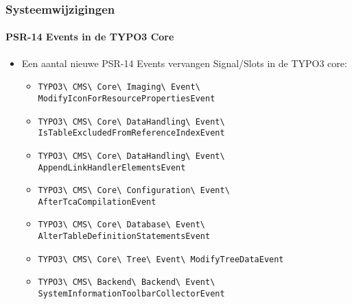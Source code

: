 \begin{frame}[fragile]
	\frametitle{Systeemwijzigingen}
	\framesubtitle{PSR-14 Events in de TYPO3 Core}

	\begin{itemize}
		\item Een aantal nieuwe PSR-14 Events vervangen Signal/Slots in de TYPO3 core:
			\newline

			\begin{itemize}\tiny
				\item \texttt{TYPO3\textbackslash
					CMS\textbackslash
					Core\textbackslash
					Imaging\textbackslash
					Event\textbackslash
					ModifyIconForResourcePropertiesEvent}
					\newline
				\item \texttt{TYPO3\textbackslash
					CMS\textbackslash
					Core\textbackslash
					DataHandling\textbackslash
					Event\textbackslash
					IsTableExcludedFromReferenceIndexEvent}
					\newline
				\item \texttt{TYPO3\textbackslash
					CMS\textbackslash
					Core\textbackslash
					DataHandling\textbackslash
					Event\textbackslash
					AppendLinkHandlerElementsEvent}
					\newline
				\item \texttt{TYPO3\textbackslash
					CMS\textbackslash
					Core\textbackslash
					Configuration\textbackslash
					Event\textbackslash
					AfterTcaCompilationEvent}
					\newline
				\item \texttt{TYPO3\textbackslash
					CMS\textbackslash
					Core\textbackslash
					Database\textbackslash
					Event\textbackslash
					AlterTableDefinitionStatementsEvent}
					\newline
				\item \texttt{TYPO3\textbackslash
					CMS\textbackslash
					Core\textbackslash
					Tree\textbackslash
					Event\textbackslash
					ModifyTreeDataEvent}
					\newline
				\item \texttt{TYPO3\textbackslash
					CMS\textbackslash
					Backend\textbackslash
					Backend\textbackslash
					Event\textbackslash
					SystemInformationToolbarCollectorEvent}
					\newline
			\end{itemize}

	\end{itemize}

\end{frame}

